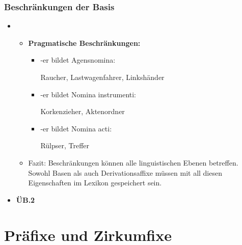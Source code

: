 \begin{frame}
\frametitle{Beschränkungen der Basis}

\begin{itemize}
\item[]

	\begin{itemize}
	
		\item \textbf{Pragmatische Beschränkungen:}
	
		\begin{itemize}
			\item -er bildet Agensnomina: 
		
			\ea Raucher, Lastwagenfahrer, Linkshänder
			\z
			
			\item -er bildet Nomina instrumenti: 
		
			\ea Korkenzieher, Aktenordner
			\z
			
			\item -er bildet Nomina acti: 
		
			\ea Rülpser, Treffer
			\z
			
		\end{itemize}
		
		\item Fazit: Beschränkungen können alle linguistischen Ebenen betreffen. Sowohl Basen als auch Derivationsaffixe müssen mit all diesen Eigenschaften im Lexikon gespeichert sein.
	
	\end{itemize}

\item \textbf{ÜB.2}	
\end{itemize}

\end{frame}



\section{Präfixe und Zirkumfixe}



